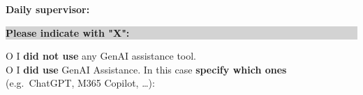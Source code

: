 \textbf{Daily supervisor:} \dotfill

\vspace{2em}

\noindent
\colorbox{lightgray}{\parbox{\dimexpr\linewidth-2\fboxsep\relax}{\textbf{Please indicate with "X":}}}

\vspace{1em}

O I \textbf{did not use} any GenAI assistance tool. \\[1em]

O I \textbf{did use} GenAI Assistance. In this case \textbf{specify which ones} (e.g.\ ChatGPT, M365 Copilot, …): \dotfill

\newpage



\newcommand{\Cell}[1]{\begin{minipage}[t]{\linewidth}\raggedright\small #1\end{minipage}}

\setlength{\tabcolsep}{6pt}
\renewcommand{\arraystretch}{1.2}

